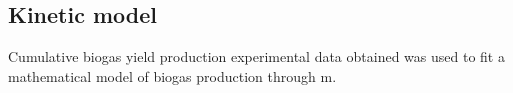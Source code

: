\subsection{Kinetic model}
Cumulative biogas yield production experimental data obtained was used to fit a mathematical model of biogas production through m.